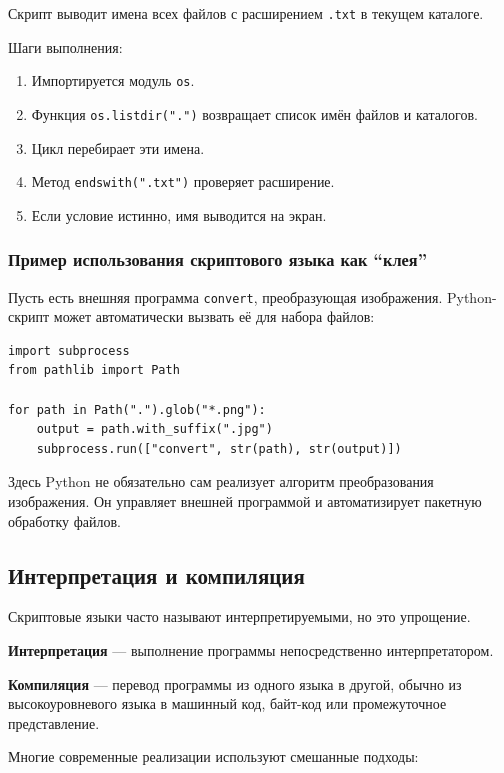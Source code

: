 \documentclass[12pt,a4paper]{article}
\begin{document}
Скрипт выводит имена всех файлов с расширением \texttt{.txt} в текущем каталоге.

Шаги выполнения:

\begin{enumerate}
    \item Импортируется модуль \texttt{os}.
    \item Функция \texttt{os.listdir(".")} возвращает список имён файлов и каталогов.
    \item Цикл перебирает эти имена.
    \item Метод \texttt{endswith(".txt")} проверяет расширение.
    \item Если условие истинно, имя выводится на экран.
\end{enumerate}

\subsubsection{Пример использования скриптового языка как ``клея''}

Пусть есть внешняя программа \texttt{convert}, преобразующая изображения. Python-скрипт
может автоматически вызвать её для набора файлов:

\begin{verbatim}
import subprocess
from pathlib import Path

for path in Path(".").glob("*.png"):
    output = path.with_suffix(".jpg")
    subprocess.run(["convert", str(path), str(output)])
\end{verbatim}

Здесь Python не обязательно сам реализует алгоритм преобразования изображения.
Он управляет внешней программой и автоматизирует пакетную обработку файлов.

\subsection{Интерпретация и компиляция}

Скриптовые языки часто называют интерпретируемыми, но это упрощение.

\textbf{Интерпретация} --- выполнение программы непосредственно интерпретатором.

\textbf{Компиляция} --- перевод программы из одного языка в другой, обычно из
высокоуровневого языка в машинный код, байт-код или промежуточное представление.

Многие современные реализации используют смешанные подходы:
\end{document}
